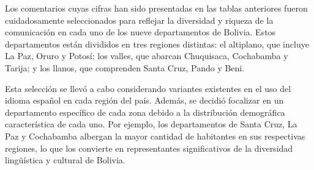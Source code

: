 Los comentarios cuyas cifras han sido presentadas en las tablas anteriores fueron cuidadosamente seleccionados para reflejar la diversidad y riqueza de la comunicación en cada uno de los nueve departamentos de Bolivia. Estos departamentos están divididos en tres regiones distintas: el altiplano, que incluye La Paz, Oruro y Potosí; los valles, que abarcan Chuquisaca, Cochabamba y Tarija; y los llanos, que comprenden Santa Cruz, Pando y Beni.

Esta selección se llevó a cabo considerando variantes existentes en el uso del idioma español en cada región del país. Además, se decidió focalizar en un departamento específico de cada zona debido a la distribución demográfica característica de cada uno. Por ejemplo, los departamentos de Santa Cruz, La Paz y Cochabamba albergan la mayor cantidad de habitantes en sus respectivas regiones, lo que los convierte en representantes significativos de la diversidad lingüística y cultural de Bolivia.



